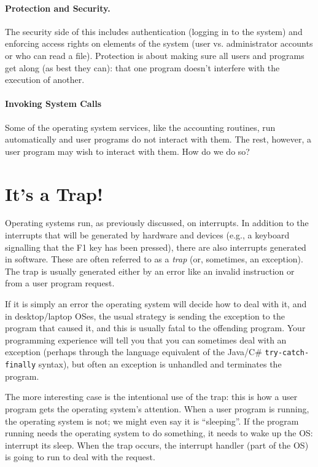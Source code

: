 \paragraph{Protection and Security.} The security side of this includes authentication (logging in to the system) and enforcing access rights on elements of the system (user vs. administrator accounts or who can read a file). Protection is about making sure all users and programs get along (as best they can): that one program doesn't interfere with the execution of another.


\paragraph{Invoking System Calls}
Some of the operating system services, like the accounting routines, run automatically and user programs do not interact with them. The rest, however, a user program may wish to interact with them. How do we do so?

\section*{It's a Trap!}
Operating systems run, as previously discussed, on interrupts. In addition to the interrupts that will be generated by hardware and devices (e.g., a keyboard signalling that the F1 key has been pressed), there are also interrupts generated in software. These are often referred to as a \textit{trap} (or, sometimes, an exception). The trap is usually generated either by an error like an invalid instruction or from a user program request. 

If it is simply an error the operating system will decide how to deal with it, and in desktop/laptop OSes, the usual strategy is sending the exception to the program that caused it, and this is usually fatal to the offending program. Your programming experience will tell you that you can sometimes deal with an exception (perhaps through the language equivalent of the Java/C\# \texttt{try-catch-finally} syntax), but often an exception is unhandled and terminates the program.

The more interesting case is the intentional use of the trap: this is how a user program gets the operating system's attention. When a user program is running, the operating system is not; we might even say it is ``sleeping''. If the program running needs the operating system to do something, it needs to wake up the OS: interrupt its sleep. When the trap occurs, the interrupt handler (part of the OS) is going to run to deal with the request. 

